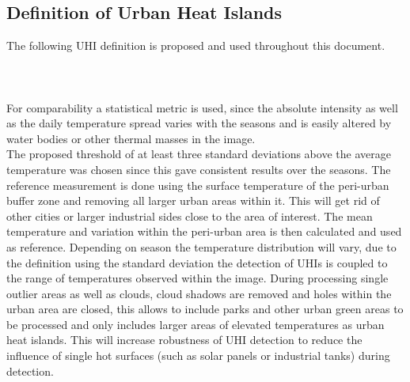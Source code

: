 \documentclass[12pt,a4paper, english,twoside]{article}
\begin{document}
    \subsection{Definition of Urban Heat Islands}\label{ssec:definition}
    The following \gls{UHI} definition is proposed and used throughout this document.\\
    \\
    \noindent{}\\ \\
      For comparability a statistical metric is used, since the absolute intensity as well as the daily temperature spread varies with the seasons 
    and is easily altered by water bodies or other thermal masses in the image.\\ 
    The proposed threshold of at least three standard deviations above the average temperature was chosen since this gave consistent results over the seasons. 
    The reference measurement is done using the surface temperature of the peri-urban buffer zone and removing all larger urban areas within it. 
    This will get rid of other cities or larger industrial sides close to the area of interest.
    The mean temperature and variation within the peri-urban area is then calculated and used as reference.
    Depending on season the temperature distribution will vary, due to the definition using the standard deviation the detection of \glspl{UHI} is coupled to the range of temperatures observed within the image. 
    During processing single outlier areas as well as clouds, cloud shadows are removed and holes within the urban area are closed, this allows to include parks and other urban green areas to be processed and only includes larger areas of elevated temperatures as urban heat islands. 
    This will increase robustness of \gls{UHI} detection to reduce the influence of single hot surfaces (such as solar panels or industrial tanks) during detection.
\end{document}
